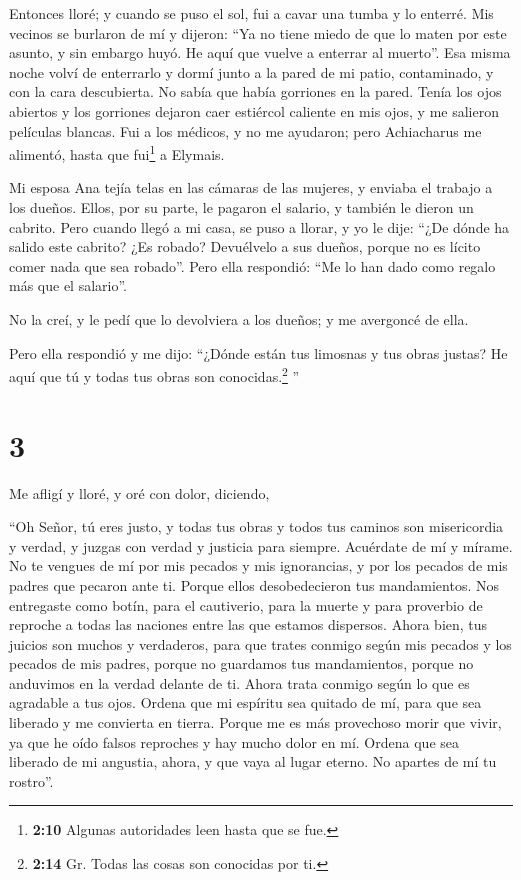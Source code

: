  Entonces lloré; y cuando se puso el sol, fui a cavar una
tumba y lo enterré.  Mis vecinos se burlaron de mí y
dijeron: ``Ya no tiene miedo de que lo maten por este asunto, y sin
embargo huyó. He aquí que vuelve a enterrar al muerto''. 
Esa misma noche volví de enterrarlo y dormí junto a la pared de mi
patio, contaminado, y con la cara descubierta.  No sabía
que había gorriones en la pared. Tenía los ojos abiertos y los gorriones
dejaron caer estiércol caliente en mis ojos, y me salieron películas
blancas. Fui a los médicos, y no me ayudaron; pero Achiacharus me
alimentó, hasta que fui\footnote{\textbf{2:10} Algunas autoridades leen
  hasta que se fue.} a Elymais.

 Mi esposa Ana tejía telas en las cámaras de las mujeres,
 y enviaba el trabajo a los dueños. Ellos, por su parte,
le pagaron el salario, y también le dieron un cabrito. 
Pero cuando llegó a mi casa, se puso a llorar, y yo le dije: ``¿De dónde
ha salido este cabrito? ¿Es robado? Devuélvelo a sus dueños, porque no
es lícito comer nada que sea robado''.  Pero ella
respondió: ``Me lo han dado como regalo más que el salario''.

No la creí, y le pedí que lo devolviera a los dueños; y me avergoncé de
ella.

Pero ella respondió y me dijo: ``¿Dónde están tus limosnas y tus obras
justas? He aquí que tú y todas tus obras son conocidas.\footnote{\textbf{2:14}
  Gr. Todas las cosas son conocidas por ti.} ''

\hypertarget{section-2}{%
\section{3}\label{section-2}}

 Me afligí y lloré, y oré con dolor, diciendo,

 ``Oh Señor, tú eres justo, y todas tus obras y todos tus
caminos son misericordia y verdad, y juzgas con verdad y justicia para
siempre.  Acuérdate de mí y mírame. No te vengues de mí
por mis pecados y mis ignorancias, y por los pecados de mis padres que
pecaron ante ti.  Porque ellos desobedecieron tus
mandamientos. Nos entregaste como botín, para el cautiverio, para la
muerte y para proverbio de reproche a todas las naciones entre las que
estamos dispersos.  Ahora bien, tus juicios son muchos y
verdaderos, para que trates conmigo según mis pecados y los pecados de
mis padres, porque no guardamos tus mandamientos, porque no anduvimos en
la verdad delante de ti.  Ahora trata conmigo según lo que
es agradable a tus ojos. Ordena que mi espíritu sea quitado de mí, para
que sea liberado y me convierta en tierra. Porque me es más provechoso
morir que vivir, ya que he oído falsos reproches y hay mucho dolor en
mí. Ordena que sea liberado de mi angustia, ahora, y que vaya al lugar
eterno. No apartes de mí tu rostro''.

